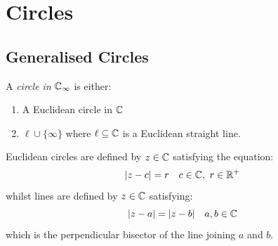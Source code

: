 \documentclass[../main.tex]{subfiles}
\begin{document}
\section{Circles}
\subsection{Generalised Circles}
\begin{definition}
  A \textit{circle in} $\mathbb{C}_{\infty}$ is either:
  \begin{enumerate}
    \item  A Euclidean circle in $\mathbb{C}$
    \item $\ell \cup \{\infty\}$ where $\ell \subseteq \mathbb{C}$ is a Euclidean straight line.
  \end{enumerate}
\end{definition}
Euclidean circles are defined by $z \in \mathbb{C}$ satisfying the equation:
\[
  |z - c| = r \quad c\in \mathbb{C},\ r \in \mathbb{R}^{+}
\]
whilst lines are defined by $z \in \mathbb{C}$ satisfying:
\[
  |z - a| = |z - b| \quad a, b \in \mathbb{C}
\]
which is the perpendicular bisector of the line joining $a$ and $b$.
\end{document}
